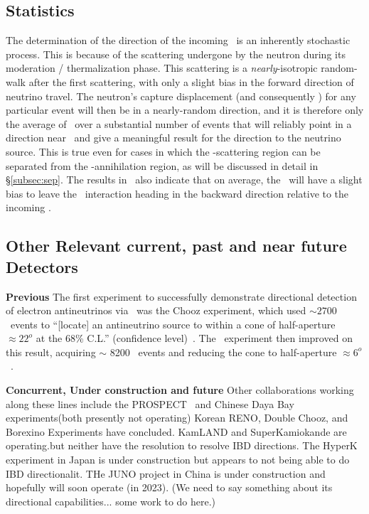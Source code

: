 \subsection{\label{subsec:dirn_stats}Statistics}
The determination of the direction of the incoming \nbc\ is an inherently stochastic process.
This is because of the scattering undergone by the neutron during its moderation / thermalization phase. %
This scattering is a \emph{nearly}-isotropic random-walk after the first scattering, with only a slight bias in the forward direction of neutrino travel.
The neutron's capture displacement (and consequently \rhat) for any particular event will then be in a nearly-random direction, and it is therefore only the average of \rhat\ over a substantial number of events that will reliably point in a direction near \snu\ and give a meaningful result for the direction to the neutrino source.
This is true even for cases in which the \nnc-scattering region can be separated from the \epc-annihilation region, as will be discussed in detail in \S\ref{subsec:sep}.
The results in~\cite{Vogel:1999zy} also indicate that on average, the \epc\ will have a slight bias to leave the \ibd\ interaction
  heading in the backward direction relative to the incoming \nbc.


\subsection{\label{subsec:dirn_prev}Other Relevant current, past and near future Detectors}

\textbf{Previous} \quad
The first experiment to successfully demonstrate directional detection of electron antineutrinos via \ibd\ was the Chooz experiment, which used $\sim 2700$ \ibd\ events to ``[locate] an antineutrino source to within a cone of half-aperture $\approx 22^o$ at the 68\% C.L.'' (confidence level)~\cite{Apollonio:1999jg}.
The \dc\ experiment then improved on this result, acquiring $\sim$ 8200 \ibd\ events and reducing the cone to half-aperture $\approx 6^o$~\cite{Caden:2012aap}. %

\textbf{Concurrent, Under construction and future} \quad
Other collaborations working along these lines include the PROSPECT~\cite{Ashenfelter:2013oaa}\cite{Ashenfelter:2015tpm} and Chinese Daya Bay~\cite{DayaBay:2012aa} experiments(both presently not operating) Korean RENO, Double Chooz, and Borexino Experiments have concluded. KamLAND and SuperKamiokande are operating.but neither have the resolution to resolve IBD directions. The HyperK experiment in Japan is under construction but appears to not being able to do IBD directionalit.  THe JUNO project in China is under construction and hopefully will soon operate (in 2023). (We need to say something about its directional capabilities... some work to do here.)

